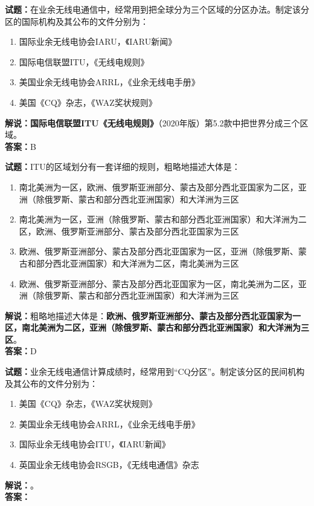 \documentclass{ctexbook}
\begin{document}
\bigskip




\noindent\textbf{试题：}在业余无线电通信中，经常用到把全球分为三个区域的分区办法。制定该分区的国际机构及其公布的文件分别为：
\begin{enumerate}[leftmargin=3em]
\item 国际业余无线电协会IARU，《IARU新闻》
\item 国际电信联盟ITU，《无线电规则》
\item 美国业余无线电协会ARRL，《业余无线电手册》
\item 美国《CQ》杂志，《WAZ奖状规则》
\end{enumerate}
\noindent\textbf{解说：}\textbf{国际电信联盟ITU《无线电规则》}（2020年版）第5.2款中把世界分成三个区域。\\\noindent\textbf{答案：}B

\bigskip




\noindent\textbf{试题：}ITU的区域划分有一套详细的规则，粗略地描述大体是：
\begin{enumerate}[leftmargin=3em]
\item 南北美洲为一区，欧洲、俄罗斯亚洲部分、蒙古及部分西北亚国家为二区，亚洲（除俄罗斯、蒙古和部分西北亚洲国家）和大洋洲为三区
\item 南北美洲为一区，亚洲（除俄罗斯、蒙古和部分西北亚洲国家）和大洋洲为二区，欧洲、俄罗斯亚洲部分、蒙古及部分西北亚国家为三区
\item 欧洲、俄罗斯亚洲部分、蒙古及部分西北亚国家为一区，亚洲（除俄罗斯、蒙古和部分西北亚洲国家）和大洋洲为二区，南北美洲为三区%
\item 欧洲、俄罗斯亚洲部分、蒙古及部分西北亚国家为一区，南北美洲为二区，亚洲（除俄罗斯、蒙古和部分西北亚洲国家）和大洋洲为三区
\end{enumerate}
\noindent\textbf{解说：}粗略地描述大体是：\textbf{欧洲、俄罗斯亚洲部分、蒙古及部分西北亚国家为一区，南北美洲为二区，亚洲（除俄罗斯、蒙古和部分西北亚洲国家）和大洋洲为三区}。\\\noindent\textbf{答案：}D

\bigskip




\noindent\textbf{试题：}业余无线电通信计算成绩时，经常用到“CQ分区”。制定该分区的民间机构及其公布的文件分别为：
\begin{enumerate}[leftmargin=3em]
\item 美国《CQ》杂志，《WAZ奖状规则》
\item 美国业余无线电协会ARRL，《业余无线电手册》
\item 国际业余无线电协会ITU，《IARU新闻》
\item 英国业余无线电协会RSGB，《无线电通信》杂志
\end{enumerate}
\noindent\textbf{解说：}\textbf{}。\\\noindent\textbf{答案：}
\end{document}
